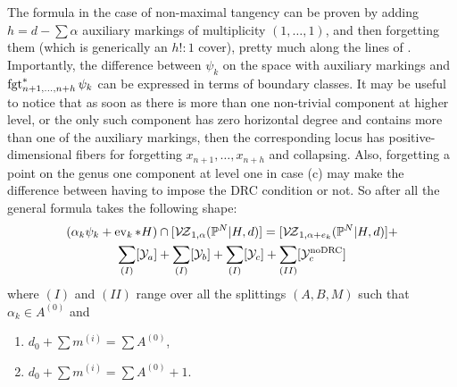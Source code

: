 The formula in the case of non-maximal tangency can be proven by adding $h=d-\sum\alpha$ auxiliary markings of multiplicity $(1,\ldots,1)$, and then forgetting them (which is generically an $h!\colon 1$ cover), pretty much along the lines of \cite[Corollary 3.5]{Ga}. Importantly, the difference between $\psi_k$ on the space with auxiliary markings and $\operatorname{fgt}_{n+1,\ldots,n+h}^*\psi_k$ can be expressed in terms of boundary classes. It may be useful to notice that as soon as there is more than one non-trivial component at higher level, or the only such component has zero horizontal degree and contains more than one of the auxiliary markings, then the corresponding locus has positive-dimensional fibers for forgetting $x_{n+1},\ldots,x_{n+h}$ and collapsing. Also, forgetting a point on the genus one component at level one in case (c) may make the difference between having to impose the DRC condition or not. So after all the general formula takes the following shape:
\begin{multline*}(\alpha_k\psi_k+\operatorname{ev}_k*H)\cap[\mathcal{V\!Z}_{1,\alpha}(\mathbb P^N|H,d)]=[\mathcal{V\!Z}_{1,\alpha+e_k}(\mathbb P^N|H,d)]+\\ \sum_{(I)}[\mathcal Y_a]+\sum_{(I)}[\mathcal Y_b]+\sum_{(I)}[\mathcal Y_c]+\sum_{(II)}[\mathcal Y_c^{\rm{no DRC}}]\end{multline*}
where $(I)$ and $(II)$ range over all the splittings $(A,B,M)$ such that $\alpha_k\in A^{(0)}$ and
\begin{enumerate}[label=(\Roman*)]
 \item $d_0+\sum m^{(i)}=\sum A^{(0)}$,
 \item $d_0+\sum m^{(i)}=\sum A^{(0)}+1$.
\end{enumerate}

